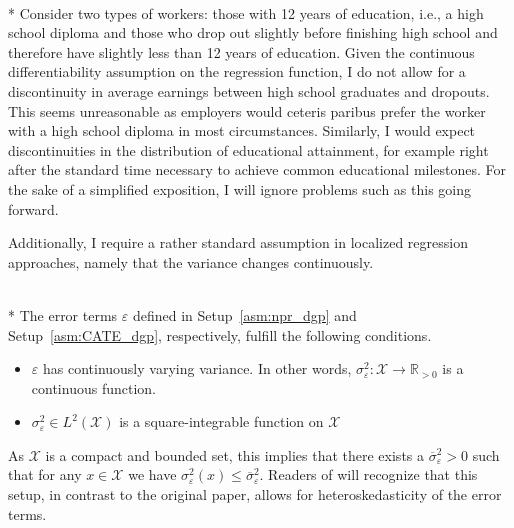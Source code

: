 \begin{boxE}
    \addtocounter{exmp}{-1}
    \begin{exmp}\mbox{}\\*
        Consider two types of workers: those with 12 years of education, i.e., a high school diploma and those who drop out slightly before finishing high school and therefore have slightly less than 12 years of education.
        Given the continuous differentiability assumption on the regression function, I do not allow for a discontinuity in average earnings between high school graduates and dropouts.
        This seems unreasonable as employers would ceteris paribus prefer the worker with a high school diploma in most circumstances.
        Similarly, I would expect discontinuities in the distribution of educational attainment, for example right after the standard time necessary to achieve common educational milestones.
        For the sake of a simplified exposition, I will ignore problems such as this going forward.
    \end{exmp}    
\end{boxE}
Additionally, I require a rather standard assumption in localized regression approaches, namely that the variance changes continuously.
\begin{boxD}
	\begin{asm}\label{asm:errors}\mbox{}\\*
		The error terms $\varepsilon$ defined in Setup~\ref{asm:npr_dgp} and Setup~\ref{asm:CATE_dgp}, respectively, fulfill the following conditions.
        \begin{itemize}
            \item $\varepsilon$ has continuously varying variance.
		      In other words, $\sigma^2_{\varepsilon}: \mathcal{X} \rightarrow \mathbb{R}_{>0}$ is a continuous function.
            \item $\sigma^2_{\varepsilon} \in L^{2}\left(\mathcal{X}\right)$ is a square-integrable function on $\mathcal{X}$
        \end{itemize}
	\end{asm}
\end{boxD}
As $\mathcal{X}$ is a compact and bounded set, this implies that there exists a $\overline{\sigma}_{\varepsilon}^2 > 0$ such that for any $x \in \mathcal{X}$ we have $\sigma^{2}_{\varepsilon}\left(x\right) \leq \overline{\sigma}_{\varepsilon}^2$.
Readers of \citet{demirkaya_optimal_2024} will recognize that this setup, in contrast to the original paper, allows for heteroskedasticity of the error terms.
